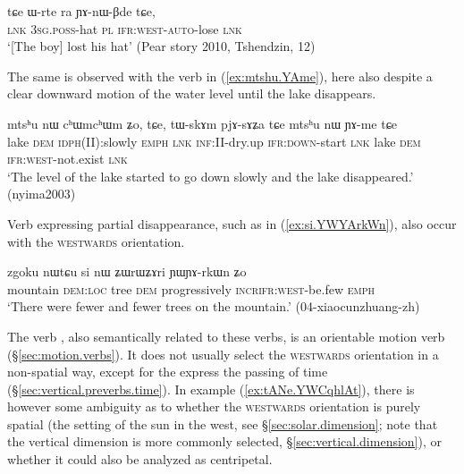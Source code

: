 \begin{exe}
\ex \label{ex:Wrte.YAnWBde}
\gll tɕe ɯ-rte ra ɲɤ-nɯ-βde tɕe, \\
\textsc{lnk} \textsc{3sg}.\textsc{poss}-hat \textsc{pl} \textsc{ifr}:\textsc{west}-\textsc{auto}-lose \textsc{lnk} \\
\glt  `[The boy] lost his hat' (Pear story 2010, Tshendzin,  12)
\end{exe} 

The same is observed with the verb  in (\ref{ex:mtshu.YAme}), here also despite a clear downward motion of the water level until the lake disappears.

\begin{exe}
\ex \label{ex:mtshu.YAme}
\gll mtsʰu nɯ cʰɯmcʰɯm ʑo, tɕe, tɯ-skɤm pjɤ-sɤʑa tɕe mtsʰu nɯ ɲɤ-me tɕe \\
lake \textsc{dem} \textsc{idph}(II):slowly \textsc{emph} \textsc{lnk} \textsc{inf}:II-dry.up \textsc{ifr}:\textsc{down}-start \textsc{lnk} lake \textsc{dem} \textsc{ifr}:\textsc{west}-not.exist \textsc{lnk} \\
\glt `The level of the lake started to go down slowly and the lake disappeared.' (nyima2003)
\end{exe} 

Verb expressing partial disappearance, such as  in (\ref{ex:si.YWYArkWn}), also occur with the \textsc{westwards} orientation.

\begin{exe}
\ex \label{ex:si.YWYArkWn}
\gll zgoku nɯtɕu si nɯ ʑɯrɯʑɤri ɲɯ\redp{}ɲɤ-rkɯn ʑo \\
mountain \textsc{dem}:\textsc{loc} tree \textsc{dem} progressively \textsc{incr}\redp{}\textsc{ifr}:\textsc{west}-be.few \textsc{emph} \\
\glt `There were fewer and fewer trees on the mountain.' (04-xiaocunzhuang-zh) 
\end{exe} 

The verb , also semantically related to these verbs, is an orientable motion verb (§\ref{sec:motion.verbs}). It does not usually select the \textsc{westwards} orientation in a non-spatial way, except for the express the passing of time (§\ref{sec:vertical.preverbs.time}). In example (\ref{ex:tANe.YWCqhlAt}), there is however some ambiguity as to whether the \textsc{westwards} orientation is purely spatial (the setting of the sun in the west, see §\ref{sec:solar.dimension}; note that the vertical dimension is more commonly selected, §\ref{sec:vertical.dimension}), or whether it could also be analyzed as centripetal.
 
